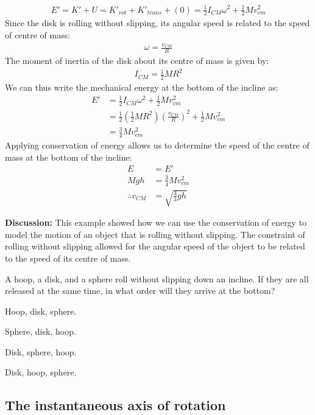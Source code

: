 \begin{example}
\begin{align*}
E' = K' + U = K'_{rot}+K'_{trans}+(0)=\frac{1}{2}I_{CM}\omega^2 + \frac{1}{2}Mv_{cm}^2
\end{align*}
Since the disk is rolling without slipping, its angular speed is related to the speed of centre of mass:
\begin{align*}
\omega = \frac{v_{CM}}{R}
\end{align*}
The moment of inertia of the disk about its centre of mass is given by:
\begin{align*}
I_{CM}=\frac{1}{2}MR^2
\end{align*}
We can thus write the mechanical energy at the bottom of the incline as:
\begin{align*}
E' &= \frac{1}{2}I_{CM}\omega^2 + \frac{1}{2}Mv_{cm}^2\\
&=\frac{1}{2}\left(  \frac{1}{2}MR^2 \right) \left(  \frac{v_{CM}}{R}\right)^2+ \frac{1}{2}Mv_{cm}^2\\
&=\frac{3}{4}Mv_{cm}^2
\end{align*}
Applying conservation of energy allows us to determine the speed of the centre of mass at the bottom of the incline:
\begin{align*}
E &= E'\\
Mgh &= \frac{3}{4}Mv_{cm}^2\\
\therefore v_{CM} &= \sqrt{\frac{4}{3}gh}
\end{align*}

\textbf{Discussion:} This example showed how we can use the conservation of energy to model the motion of an object that is rolling without slipping. The constraint of rolling without slipping allowed for the angular speed of the object to be related to the speed of its centre of mass.
\end{example}

\begin{checkpoint}
\begin{MCquestion}{A hoop, a disk, and a sphere roll without slipping down an incline. If they are all released at the same time, in what order will they arrive at the bottom?}
\item Hoop, disk, sphere.
\item Sphere, disk, hoop. \correct
\item Disk, sphere, hoop.
\item Disk, hoop, sphere.
\end{MCquestion}
\end{checkpoint}

\subsection{The instantaneous axis of rotation}

